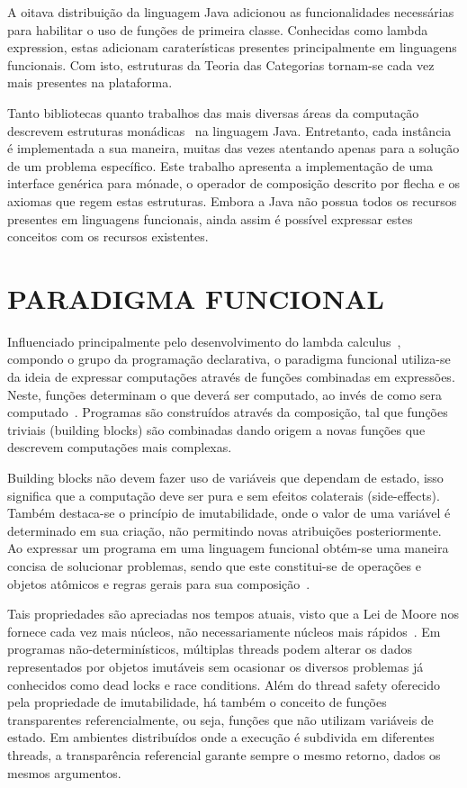 \documentclass[10pt, conference]{IEEEtran}
\begin{document}
A oitava distribuição da linguagem Java adicionou as funcionalidades necessárias para habilitar o uso de funções de primeira classe. Conhecidas como lambda expression, estas adicionam caraterísticas presentes principalmente em linguagens funcionais. Com isto, estruturas da Teoria das Categorias tornam-se cada vez mais presentes na plataforma.

Tanto bibliotecas quanto trabalhos das mais diversas áreas da computação descrevem estruturas monádicas~\cite{crestani2013quantum, dubois2009domainspecific, urma2014java} na linguagem Java. Entretanto, cada instância é implementada a sua maneira, muitas das vezes atentando apenas para a solução de um problema específico. Este trabalho apresenta a implementação de uma interface genérica para mónade, o operador de composição descrito por flecha e os axiomas que regem estas estruturas. Embora a Java não possua todos os recursos presentes em linguagens funcionais, ainda assim é possível expressar estes conceitos com os recursos existentes.

\section{PARADIGMA FUNCIONAL}
\label{sec:func-para}

Influenciado principalmente pelo desenvolvimento do lambda calculus~\cite{hudak1989conception}, compondo o grupo da programação declarativa, o paradigma funcional utiliza-se da ideia de expressar computações através de funções combinadas em expressões. Neste, funções determinam o que deverá ser computado, ao invés de como sera computado~\cite{louden2011programming}. Programas são construídos através da composição, tal que funções triviais (building blocks) são combinadas dando origem a novas funções que descrevem computações mais complexas.

Building blocks não devem fazer uso de variáveis que dependam de estado, isso significa que a computação deve ser pura e sem efeitos colaterais (side-effects). Também destaca-se o princípio de imutabilidade, onde o valor de uma variável é determinado em sua criação, não permitindo novas atribuições posteriormente. Ao expressar um programa em uma linguagem funcional obtém-se uma maneira concisa de solucionar problemas, sendo que este constitui-se de operações e objetos atômicos e regras gerais para sua composição~\cite{michaelson2011introduction}.

Tais propriedades são apreciadas nos tempos atuais, visto que a Lei de Moore nos fornece cada vez mais núcleos, não necessariamente núcleos mais rápidos~\cite{jsr335}. Em programas não-determinísticos, múltiplas threads podem alterar os dados representados por objetos imutáveis sem ocasionar os diversos problemas já conhecidos como dead locks e race conditions. Além do thread safety oferecido pela propriedade de imutabilidade, há também o conceito de funções transparentes referencialmente, ou seja, funções que não utilizam variáveis de estado. Em ambientes distribuídos onde a execução é subdivida em diferentes threads, a transparência referencial garante sempre o mesmo retorno, dados os mesmos argumentos.
\end{document}
